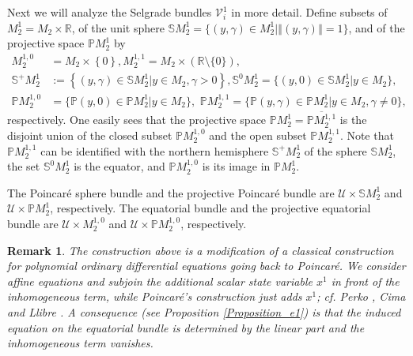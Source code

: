 \documentclass{siamltex}%
\newtheorem{remark}[theorem]{Remark}
\begin{document}
Next we will analyze the Selgrade bundles $\mathcal{V}_{i}^{1}$ in more
detail. Define subsets of $M_{2}^{1}=M_{2}\times\mathbb{R}$, of the unit
sphere $\mathbb{S}M_{2}^{1}=\{(y,\gamma)\in M_{2}^{1}\left\vert \left\Vert
(y,\gamma)\right\Vert =1\right.  \}$, and of the projective space
$\mathbb{P}M_{2}^{1}$ by%
\begin{align*}
M_{2}^{1,0}  &  =M_{2}\times\left\{  0\right\}  ,M_{2}^{1,1}=M_{2}%
\times\left(  \mathbb{R}\setminus\{0\}\right)  ,\\
\mathbb{S}^{+}M_{2}^{1}  &  :=\left\{  (y,\gamma)\in\mathbb{S}M_{2}%
^{1}\left\vert y\in M_{2},\gamma>0\right.  \right\}  ,\mathbb{S}^{0}M_{2}%
^{1}=\{(y,0)\in\mathbb{S}M_{2}^{1}\left\vert y\in M_{2}\right.  \},\\
\mathbb{P}M_{2}^{1,0}  &  =\{\mathbb{P}(y,0)\in\mathbb{P}M_{2}^{1}\left\vert
y\in M_{2}\right.  \},\,\,\mathbb{P}M_{2}^{1,1}=\{\mathbb{P}(y,\gamma
)\in\mathbb{P}M_{2}^{1}\left\vert y\in M_{2},\gamma\not =0\right.  \},
\end{align*}
respectively. One easily sees that the projective space $\mathbb{P}M_{2}%
^{1}=\overline{\mathbb{P}M_{2}^{1,1}}$ is the disjoint union of the closed
subset $\mathbb{P}M_{2}^{1,0}$ and the open subset $\mathbb{P}M_{2}^{1,1}$.
Note that $\mathbb{P}M_{2}^{1,1}$ can be identified with the northern
hemisphere $\mathbb{S}^{+}M_{2}^{1}$ of the sphere $\mathbb{S}M_{2}^{1}$, the
set $\mathbb{S}^{0}M_{2}^{1}$ is the equator, and $\mathbb{P}M_{2}^{1,0}$ is
its image in $\mathbb{P}M_{2}^{1}$.

\begin{definition}
The Poincar\'{e} sphere bundle and the projective Poincar\'{e} bundle are
$\mathcal{U}\times\mathbb{S}M_{2}^{1}$ and $\mathcal{U}\times\mathbb{P}%
M_{2}^{1}$, respectively. The equatorial bundle and the projective equatorial
bundle are $\mathcal{U}\times M_{2}^{1,0}$ and $\mathcal{U}\times
\mathbb{P}M_{2}^{1,0}$, respectively.
\end{definition}

\begin{remark}
\label{Remark_sphere}The construction above is a modification of a classical
construction for polynomial ordinary differential equations going back to
Poincar\'{e}. We consider affine equations and subjoin the additional scalar
state variable $x^{1}$ in front of the inhomogeneous term, while
Poincar\'{e}'s construction just adds $x^{1}$; cf. Perko \cite{Perko}, Cima
and Llibre \cite{CimL90}. A consequence (see Proposition \ref{Proposition_e1})
is that the induced equation on the equatorial bundle is determined by the
linear part and the inhomogeneous term vanishes.
\end{remark}
\end{document}
